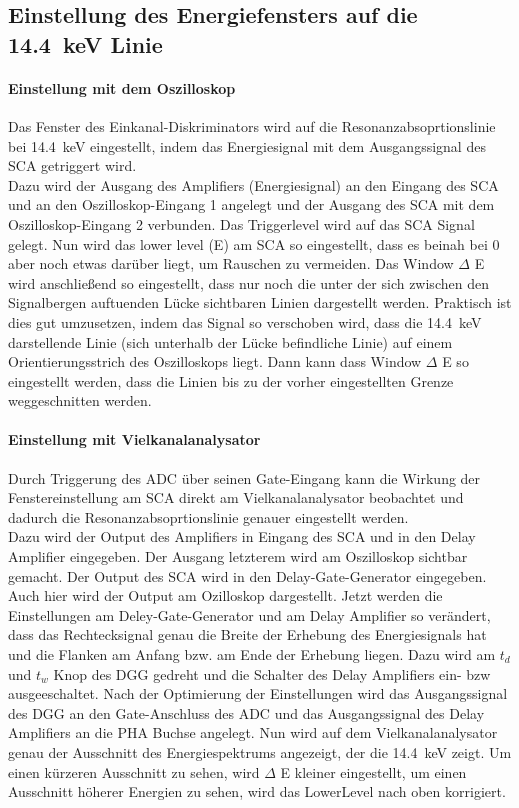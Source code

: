 \documentclass[a4paper,twoside,final]{article}
\begin{document}
\subsection{Einstellung des Energiefensters auf die \SI{14,4}{\kilo\eV} Linie}
\paragraph{Einstellung mit dem Oszilloskop}
Das Fenster des Einkanal-Diskriminators wird auf die Resonanzabsoprtionslinie bei \SI{14,4}{\kilo\eV} eingestellt, indem das Energiesignal mit dem Ausgangssignal des SCA getriggert wird. \\
Dazu wird der Ausgang des Amplifiers (Energiesignal) an den Eingang des SCA
und an den Oszilloskop-Eingang 1 angelegt und der Ausgang des SCA mit dem Oszilloskop-Eingang 2 verbunden. Das Triggerlevel wird auf das SCA Signal gelegt. Nun wird das lower level (E) am SCA so eingestellt, dass es beinah bei 0 aber noch etwas darüber liegt, um Rauschen zu vermeiden. Das Window $\Delta$ E wird anschließend so eingestellt, dass nur noch die unter der sich zwischen den Signalbergen auftuenden Lücke sichtbaren Linien dargestellt werden. Praktisch ist dies gut umzusetzen, indem das Signal so verschoben wird, dass die \SI{14,4}{\kilo\eV} darstellende Linie (sich unterhalb der Lücke befindliche Linie) auf einem Orientierungsstrich des Oszilloskops liegt. Dann kann dass Window $\Delta$ E so eingestellt werden, dass die Linien bis zu der vorher eingestellten Grenze weggeschnitten werden.

\paragraph{Einstellung mit Vielkanalanalysator}
Durch Triggerung des  ADC über seinen Gate-Eingang kann die Wirkung der Fenstereinstellung am SCA direkt am Vielkanalanalysator beobachtet und dadurch die Resonanzabsoprtionslinie genauer eingestellt werden. \\
Dazu wird der Output des Amplifiers in Eingang des SCA und in den Delay Amplifier eingegeben. Der Ausgang letzterem wird am Oszilloskop sichtbar gemacht. Der Output des SCA wird in den Delay-Gate-Generator eingegeben.
Auch hier wird der Output am Ozilloskop dargestellt. Jetzt werden die Einstellungen am Deley-Gate-Generator und am Delay Amplifier so verändert, dass das Rechtecksignal genau die Breite der Erhebung des Energiesignals hat und die Flanken am Anfang bzw. am Ende der Erhebung liegen. Dazu wird am $t_d$ und $t_w$ Knop des DGG gedreht und die Schalter des Delay Amplifiers ein- bzw ausgeeschaltet. Nach der Optimierung der Einstellungen wird das Ausgangssignal des DGG an den Gate-Anschluss des ADC und das Ausgangssignal des Delay Amplifiers an die PHA Buchse angelegt. Nun wird auf dem Vielkanalanalysator genau der Ausschnitt des Energiespektrums angezeigt, der die \SI{14,4}{\kilo\eV} zeigt. Um einen kürzeren Ausschnitt zu sehen, wird $\Delta$ E kleiner eingestellt, um einen Ausschnitt höherer Energien zu sehen, wird das LowerLevel nach oben korrigiert. \\
\end{document}
